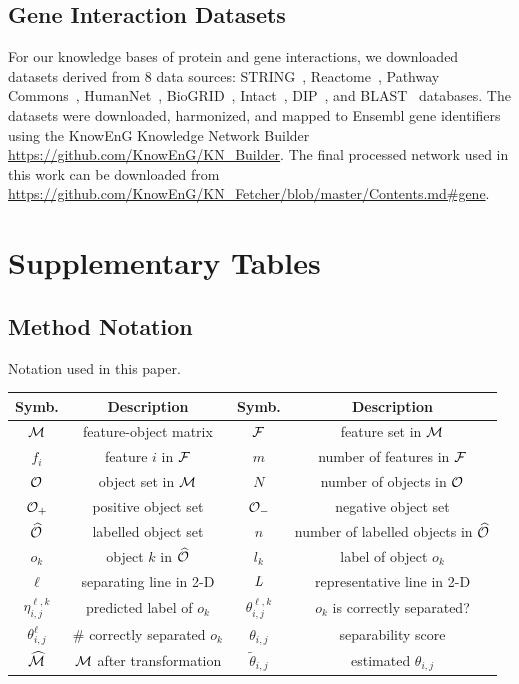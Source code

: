 \subsection{Gene Interaction Datasets} \label{app:relation_data}
For our knowledge bases of protein and gene interactions, we downloaded datasets derived from 8 data sources:
STRING~\cite{szklarczyk2014string}, Reactome~\cite{croft2013reactome}, Pathway Commons~\cite{cerami2010pathway},
HumanNet~\cite{lee2011prioritizing}, BioGRID~\cite{chatr2017biogrid}, Intact~\cite{orchard2013mintact},
DIP~\cite{salwinski2004database}, and BLAST~\cite{altschul1990basic} databases. 
The datasets were downloaded, harmonized, and mapped to Ensembl gene identifiers using the 
KnowEnG Knowledge Network Builder \url{https://github.com/KnowEnG/KN_Builder}. 
The final processed network used in this work can be downloaded from \url{https://github.com/KnowEnG/KN_Fetcher/blob/master/Contents.md#gene}.


\section{Supplementary Tables}

\subsection{\genviz Method Notation}\label{appT:notation}
Notation used in this paper.
\begin{table}[h]
\centering
\vspace{-5mm}
\small
\begin{tabular}{|c|c|c|c|}
 \hline
 Symb. & Description & Symb. & Description\\
 \hline
 \hline
 ${\mathcal{M}}$ & feature-object matrix & ${\mathcal{F}}$ & feature set in ${\mathcal{M}}$ \\
 \hline
 $f_i$ & feature $i$ in ${\mathcal{F}}$ & $m$ & number of features in ${\mathcal{F}}$\\
 \hline
 ${\mathcal{O}}$ & object set in ${\mathcal{M}}$ & $N$ & number of objects in ${\mathcal{O}}$\\
 \hline
 ${\mathcal{O}}_+$ & positive object set & ${\mathcal{O}}_-$ & negative object set\\
 \hline
 $\widehat{{\mathcal{O}}}$ & labelled object set & $n$ & number of labelled objects in $\widehat{{\mathcal{O}}}$\\
 \hline
 $o_k$ & object $k$ in $\widehat{{\mathcal{O}}}$ & $l_k$ & label of object $o_k$\\
 \hline
 $\ell$ & separating line in 2-D & $\mathit{L}$ & representative line in 2-D\\
 \hline
 $\eta_{i,j}^{\ell,k}$ & predicted label of $o_k$ & $\theta_{i,j}^{\ell,k}$ & $o_k$ is correctly separated? \\
 \hline
 $\theta_{i,j}^{\ell}$ & \# correctly separated $o_k$ & $\theta_{i,j}$ & separability score\\
 \hline
 $\widehat{{\mathcal{M}}}$ & ${\mathcal{M}}$ after transformation & $\tilde{\theta}_{i,j}$ & estimated $\theta_{i,j}$\\
 \hline
 \end{tabular}
\label{tbl:notation}
\vspace{-18pt}
\end{table}


